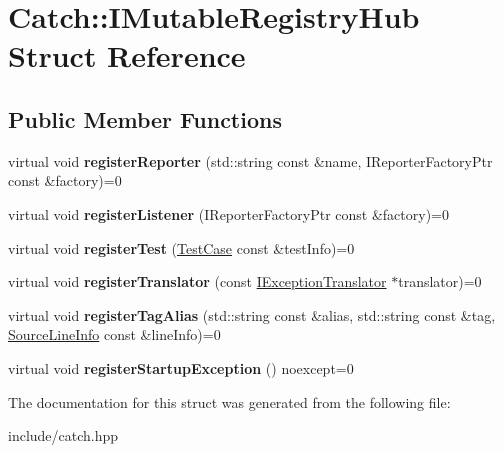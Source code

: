 \hypertarget{structCatch_1_1IMutableRegistryHub}{}\section{Catch\+:\+:I\+Mutable\+Registry\+Hub Struct Reference}
\label{structCatch_1_1IMutableRegistryHub}
\subsection*{Public Member Functions}
\begin{DoxyCompactItemize}
\item 
virtual void {\bfseries register\+Reporter} (std\+::string const \&name, I\+Reporter\+Factory\+Ptr const \&factory)=0\hypertarget{structCatch_1_1IMutableRegistryHub_a1c0ac202ac31ee9f88e8ff5cbac4b243}{}\label{structCatch_1_1IMutableRegistryHub_a1c0ac202ac31ee9f88e8ff5cbac4b243}

\item 
virtual void {\bfseries register\+Listener} (I\+Reporter\+Factory\+Ptr const \&factory)=0\hypertarget{structCatch_1_1IMutableRegistryHub_abd892a133f85581fd00ee75bb379ca56}{}\label{structCatch_1_1IMutableRegistryHub_abd892a133f85581fd00ee75bb379ca56}

\item 
virtual void {\bfseries register\+Test} (\hyperlink{classCatch_1_1TestCase}{Test\+Case} const \&test\+Info)=0\hypertarget{structCatch_1_1IMutableRegistryHub_a11b85c6744d88c9f83fe16ad4a8dd451}{}\label{structCatch_1_1IMutableRegistryHub_a11b85c6744d88c9f83fe16ad4a8dd451}

\item 
virtual void {\bfseries register\+Translator} (const \hyperlink{structCatch_1_1IExceptionTranslator}{I\+Exception\+Translator} $\ast$translator)=0\hypertarget{structCatch_1_1IMutableRegistryHub_ae6825365102693cf7707db022a2c2b49}{}\label{structCatch_1_1IMutableRegistryHub_ae6825365102693cf7707db022a2c2b49}

\item 
virtual void {\bfseries register\+Tag\+Alias} (std\+::string const \&alias, std\+::string const \&tag, \hyperlink{structCatch_1_1SourceLineInfo}{Source\+Line\+Info} const \&line\+Info)=0\hypertarget{structCatch_1_1IMutableRegistryHub_abf2e386b6f94f615719ada711adbf822}{}\label{structCatch_1_1IMutableRegistryHub_abf2e386b6f94f615719ada711adbf822}

\item 
virtual void {\bfseries register\+Startup\+Exception} () noexcept=0\hypertarget{structCatch_1_1IMutableRegistryHub_a72a7d5386851ac3200f8da794a009c86}{}\label{structCatch_1_1IMutableRegistryHub_a72a7d5386851ac3200f8da794a009c86}

\end{DoxyCompactItemize}


The documentation for this struct was generated from the following file\+:\begin{DoxyCompactItemize}
\item 
include/catch.\+hpp\end{DoxyCompactItemize}
